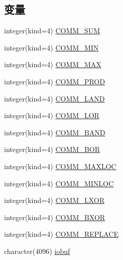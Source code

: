 \subsection*{变量}
\begin{DoxyCompactItemize}
\item 
integer(kind=4) \hyperlink{namespaceutility_ab4f4798be78a04776caf765b9649fb40}{COMM\_\-SUM}
\item 
integer(kind=4) \hyperlink{namespaceutility_ac9e4f475384ab10881241a6d94926686}{COMM\_\-MIN}
\item 
integer(kind=4) \hyperlink{namespaceutility_aa047c79aef63ff154b0eac44ec8e78c7}{COMM\_\-MAX}
\item 
integer(kind=4) \hyperlink{namespaceutility_ac007ebc5ff080707309b709eaf627c4f}{COMM\_\-PROD}
\item 
integer(kind=4) \hyperlink{namespaceutility_a9f57cfbd8fe711ae3aa4fd939befe32d}{COMM\_\-LAND}
\item 
integer(kind=4) \hyperlink{namespaceutility_a84fc0cdbf8b54f2cff80170d1dd375b5}{COMM\_\-LOR}
\item 
integer(kind=4) \hyperlink{namespaceutility_ad6a4a4dc93ce4c7954383fd79547415e}{COMM\_\-BAND}
\item 
integer(kind=4) \hyperlink{namespaceutility_a571a1353450878c872ab821842c903bb}{COMM\_\-BOR}
\item 
integer(kind=4) \hyperlink{namespaceutility_a64b1d9ff2637bcfc6c7a8a6a4373b45e}{COMM\_\-MAXLOC}
\item 
integer(kind=4) \hyperlink{namespaceutility_ae670c852884473e9ff57f5184c19a844}{COMM\_\-MINLOC}
\item 
integer(kind=4) \hyperlink{namespaceutility_a8bfb05876a1579246420ebf616f24e12}{COMM\_\-LXOR}
\item 
integer(kind=4) \hyperlink{namespaceutility_a1738a7d6502f88e9dc6b93be81f43faf}{COMM\_\-BXOR}
\item 
integer(kind=4) \hyperlink{namespaceutility_a0774c1eca038528c11297ffd22bbbfaa}{COMM\_\-REPLACE}
\item 
character(4096) \hyperlink{namespaceutility_a3003cfe86f93564a5c4458faa6c5124f}{iobuf}
\end{DoxyCompactItemize}


